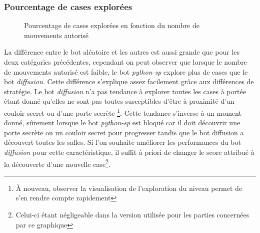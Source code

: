 \documentclass[a4paper,12pt]{article}
\begin{document}
\subsubsection{Pourcentage de cases explorées}

\begin{figure}[H]
  \caption{\label{fig:squares_explored} Pourcentage de cases explorées en
    fonction du nombre de mouvements autorisé}
\end{figure}

La différence entre le bot aléatoire et les autres est aussi grande que pour les
deux catégories précédentes, cependant on peut observer que lorsque le nombre de
mouvements autorisé est faible, le bot {\em python-sp} explore plus de cases que
le bot {\em diffusion}. Cette différence s'explique assez facilement grâce aux
différences de stratégie. Le bot {\em diffusion} n'a pas tendance à explorer
toutes les cases à portée étant donné qu'elles ne sont pas toutes susceptibles
d'être à proximité d'un couloir secret ou d'une porte secrète \footnote{À
  nouveau, observer la visualisation de l'exploration du niveau permet de s'en
  rendre compte rapidement}. Cette tendance s'inverse à un moment donné,
sûrement lorsque le bot {\em python-sp} est bloqué car il doit découvrir une
porte secrète ou un couloir secret pour progresser tandis que le bot diffusion a
découvert toutes les salles. Si l'on souhaite améliorer les performances du bot
{\em diffusion} pour cette caractéristique, il suffit à priori de changer le
score attribué à la découverte d'une nouvelle case\footnote{Celui-ci étant
négligeable dans la version utilisée pour les parties concernées par ce
graphique}.
\end{document}
